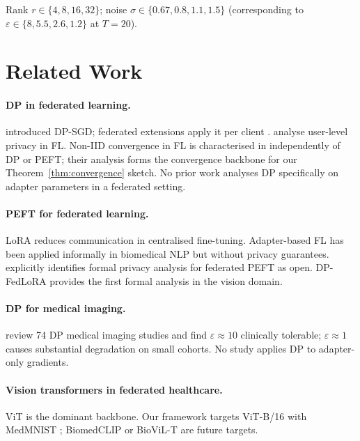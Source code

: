 ﻿\documentclass{article}
\newcommand{\method}{DP-FedLoRA}
\renewcommand{\eps}{\varepsilon}
\newcommand{\noise}{\sigma}
\begin{document}
Rank $r \in \{4, 8, 16, 32\}$; noise $\noise \in \{0.67, 0.8, 1.1, 1.5\}$
(corresponding to $\eps \in \{8, 5.5, 2.6, 1.2\}$ at $T{=}20$).

\section{Related Work}
\label{sec:related}

\paragraph{DP in federated learning.}
\citet{abadi2016deep} introduced DP-SGD; federated extensions
apply it per client \citep{mcmahan2017communication}.
\citet{levy2021learning} analyse user-level privacy in FL.
Non-IID convergence in FL is characterised in
\citet{karimireddy2020scaffold} independently of DP or PEFT;
their analysis forms the convergence backbone for our
Theorem~\ref{thm:convergence} sketch.
No prior work analyses DP specifically on adapter parameters in a federated
setting.

\paragraph{PEFT for federated learning.}
LoRA \citep{hu2022lora} reduces communication in centralised
fine-tuning.
Adapter-based FL has been applied informally in biomedical NLP
\citep{li2024federated} but without privacy guarantees.
\citet{li2024federated} explicitly identifies formal privacy
analysis for federated PEFT as open.
\method{} provides the first formal analysis in the vision domain.

\paragraph{DP for medical imaging.}
\citet{mohammadi2025differential} review 74 DP medical imaging studies and
find $\eps \approx 10$ clinically tolerable; $\eps \approx 1$ causes
substantial degradation on small cohorts.
No study applies DP to adapter-only gradients.

\paragraph{Vision transformers in federated healthcare.}
ViT \citep{dosovitskiy2021image} is the dominant backbone.
Our framework targets ViT-B/16 with MedMNIST
\citep{yang2023medmnist}; BiomedCLIP or BioViL-T are
future targets.
\end{document}
